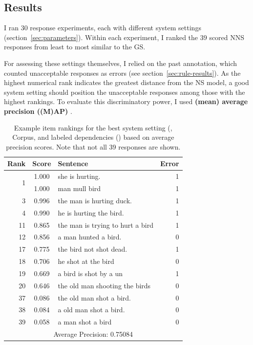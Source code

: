\subsection{Results}
\label{sec:metrics}

I ran 30 response experiments, each with different system settings
(section~\ref{sec:parameters}). Within each experiment, I ranked the 39
scored NNS responses from least to most similar to the GS.

For assessing these settings themselves, I relied on the past annotation, which counted unacceptable responses as errors (see section~\ref{sec:rule-results}).  As the highest numerical rank indicates the greatest distance from the NS model, a good system setting should position the unacceptable responses among those with the highest rankings.
To evaluate this discriminatory power, I used \textbf{(mean) average precision ((M)AP)}
\citep[][ch. 8]{manning-et-al:08}.

\begin{table}[htb!]
\begin{center}
\setlength{\tabcolsep}{0.3em}
\begin{tabular}{|r|c|l|r|}
\hline
Rank & Score & Sentence & Error \\
\hline
\hline
\multirow{2}{*}{1} & 1.000 & she is hurting. & 1 \\
& 1.000 & man mull bird & 1 \\
\hline
3 & 0.996 & the man is hurting duck. & 1 \\
4 & 0.990 & he is hurting the bird. & 1 \\
\hline
11 & 0.865 & the man is trying to hurt a bird & 1 \\
12 & 0.856 & a man hunted a bird. & 0 \\
\hline
17 & 0.775 & the bird not shot dead.  & 1 \\
18 & 0.706 & he shot at the bird & 0 \\
19 & 0.669 & a bird is shot by a un & 1 \\
20 & 0.646 & the old man shooting the birds & 0 \\
\hline
37 & 0.086 & the old man shot a bird. & 0 \\
38 & 0.084 & a old man shot a bird. & 0 \\
39 & 0.058 & a man shot a bird & 0 \\
\hline
\hline
\multicolumn{4}{|c|}{Average Precision: 0.75084} \\
\hline
\end{tabular}
\caption{Example item rankings for the best system setting (,  Corpus, and labeled dependencies () based on average precision scores. Note that not all 39 responses are shown.}
\label{tab:i10responses-avgprec}
\end{center}
\end{table}

